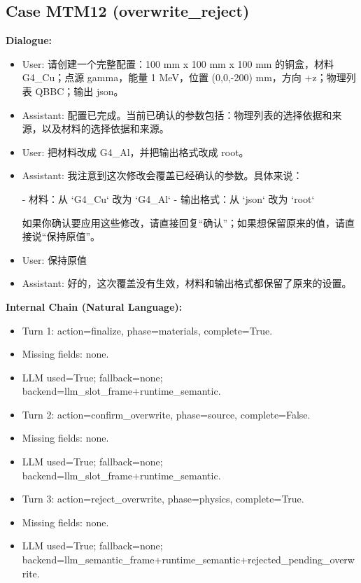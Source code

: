 \documentclass[11pt]{ctexart}
\begin{document}
\subsection{Case MTM12 (overwrite\_reject)}
\textbf{Dialogue:}
\begin{itemize}
\item User: 请创建一个完整配置：100 mm x 100 mm x 100 mm 的铜盒，材料 G4\_Cu；点源 gamma，能量 1 MeV，位置 (0,0,-200) mm，方向 +z；物理列表 QBBC；输出 json。
\item Assistant: 配置已完成。当前已确认的参数包括：物理列表的选择依据和来源，以及材料的选择依据和来源。
\item User: 把材料改成 G4\_Al，并把输出格式改成 root。
\item Assistant: 我注意到这次修改会覆盖已经确认的参数。具体来说：

- 材料：从 `G4\_Cu` 改为 `G4\_Al`
- 输出格式：从 `json` 改为 `root`

如果你确认要应用这些修改，请直接回复“确认”；如果想保留原来的值，请直接说“保持原值”。
\item User: 保持原值
\item Assistant: 好的，这次覆盖没有生效，材料和输出格式都保留了原来的设置。
\end{itemize}
\textbf{Internal Chain (Natural Language):}
\begin{itemize}
\item Turn 1: action=finalize, phase=materials, complete=True.
\item Missing fields: none.
\item LLM used=True; fallback=none; backend=llm\_slot\_frame+runtime\_semantic.
\item Turn 2: action=confirm\_overwrite, phase=source, complete=False.
\item Missing fields: none.
\item LLM used=True; fallback=none; backend=llm\_slot\_frame+runtime\_semantic.
\item Turn 3: action=reject\_overwrite, phase=physics, complete=True.
\item Missing fields: none.
\item LLM used=True; fallback=none; backend=llm\_semantic\_frame+runtime\_semantic+rejected\_pending\_overwrite.
\end{itemize}
\end{document}
